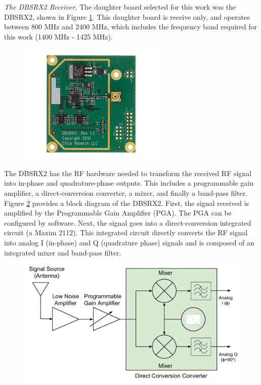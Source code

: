 \emph{The DBSRX2 Receiver.}  The daughter board selected for this work was the DBSRX2, shown in Figure \ref{dbsrx2}.  This daughter board is receive only, and operates between 800 MHz and 2400 MHz, which includes the frequency band required for this work (1400 MHz - 1425 MHz).

{\begin{figure}[h!tb] 
\centering
\includegraphics[width=7cm]{Images/dbsrx2.jpg}
\label{dbsrx2}
\end{figure}
}

The DBSRX2 has the RF hardware needed to transform the received RF signal into in-phase and quadrature-phase outputs.  This includes a programmable gain amplifier, a direct-conversion converter, a mixer, and finally a band-pass filter.  Figure \ref{dbsrx2_block} provides a block diagram of the DBSRX2.  First, the signal received is amplified by the Programmable Gain Amplifier (PGA).  The PGA can be configured by software.  Next, the signal goes into a direct-conversion integrated circuit (a Maxim 2112).  This integrated circuit directly converts the RF signal into analog I (in-phase) and Q (quadrature phase) signals and is composed of an integrated mixer and band-pass filter.

{\begin{figure}[h!tb] 
\centering
\includegraphics[width=12cm]{Images/DBSRX2_block.pdf}
\label{dbsrx2_block}
\end{figure}
}

